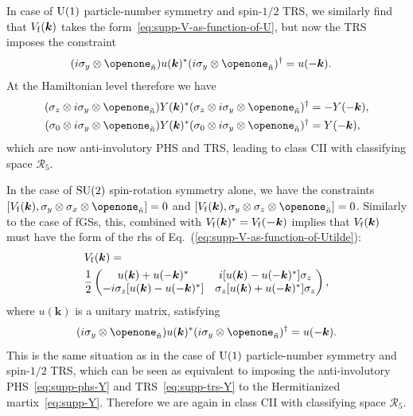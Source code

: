 \documentclass[prl,twocolumn,preprintnumbers,superscriptaddress,amsmath,amssymb]{revtex4-1}
\begin{document}
In case of ${\rm U}(1)$ particle-number symmetry and spin-$1/2$ TRS, we similarly find that $V_{\rm f}(\boldsymbol{k})$ takes the form~\eqref{eq:supp-V-as-function-of-U}, but now the TRS imposes the constraint
\begin{align}
     (i\sigma_y \otimes \openone_{\tilde n}) u(\boldsymbol{k})^* (i\sigma_y \otimes \openone_{\tilde n})^\dag &= u(-\boldsymbol{k}).
     \label{AIIV}
\end{align}
At the Hamiltonian level therefore we have
\begin{align}
    (\sigma_z \otimes i\sigma_y \otimes \openone_{\tilde n}) Y(\boldsymbol{k})^* (\sigma_z \otimes i\sigma_y \otimes \openone_{\tilde n})^\dag &= -Y(-\boldsymbol{k}), \label{eq:supp-phs-Y}\\
    (\sigma_0 \otimes i\sigma_y \otimes \openone_{\tilde n}) Y(\boldsymbol{k})^* (\sigma_0 \otimes i\sigma_y \otimes \openone_{\tilde n})^\dag &= Y(-\boldsymbol{k}),
     \label{eq:supp-trs-Y}
\end{align}
which are now anti-involutory PHS and TRS, leading to class CII with classifying space $\mathcal{R}_5$.

In the case of ${\rm SU}(2)$ spin-rotation symmetry alone, we have the constraints $[V_{\rm f}(\boldsymbol{k}),\sigma_y\otimes\sigma_x\otimes\openone_{\tilde n}]=0$ and $[V_{\rm f}(\boldsymbol{k}),\sigma_y\otimes\sigma_z\otimes\openone_{\tilde n}]=0$.
Similarly to the case of fGSs, this, combined with $V_{\rm f}(\boldsymbol{k})^*=V_{\rm f}(\boldsymbol{-k})$ implies that $V_{\rm f}(\boldsymbol{k})$ must have the form of the rhs of  Eq.~(\ref{eq:supp-V-as-function-of-Utilde}):
\begin{align}
&V_{\rm f}(\boldsymbol{k})=\nonumber \\
&\frac{1}{2}\begin{pmatrix} u(\boldsymbol{k}) + u(-\boldsymbol{k})^* & i[u(\boldsymbol{k}) - u(-\boldsymbol{k})^*] \sigma_z \\ - i\sigma_z [u(\boldsymbol{k}) - u(-\boldsymbol{k})^*] & \sigma_z [u(\boldsymbol{k}) + u(-\boldsymbol{k})^*] \sigma_z \end{pmatrix},
\label{CVI}
\end{align} 
where $u(\boldsymbol{k})$ is a unitary matrix, satisfying 
\begin{equation}
    (i\sigma_y \otimes \openone_{\tilde n}) u(\boldsymbol{k})^*(i\sigma_y \otimes \openone_{\tilde n})^\dag = u(-\boldsymbol{k}).
    \label{CV}
\end{equation}
This is the same situation as in the case of ${\rm U}(1)$ particle-number symmetry and spin-$1/2$ TRS, which can be seen as equivalent to imposing the anti-involutory PHS~\eqref{eq:supp-phs-Y} and TRS~\eqref{eq:supp-trs-Y} to the Hermitianized martix~\eqref{eq:supp-Y}. Therefore we are again in class CII with classifying space $\mathcal{R}_5$.
\end{document}
